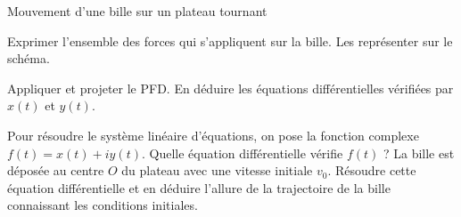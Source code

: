 \begin{exo}[PC][3][python]{Mouvement d'une bille sur un plateau tournant}
\begin{quest}
\item  Exprimer l'ensemble des forces qui s'appliquent sur la bille. Les représenter sur le schéma.

\item Appliquer et projeter le PFD. En déduire les équations différentielles vérifiées par $x(t)$ et $y(t)$.


\item  Pour résoudre le système linéaire d'équations, on pose la fonction complexe $f(t)=x(t) + iy(t)$. Quelle équation différentielle vérifie $f(t)$ ?  La bille est déposée au centre $O$ du plateau avec une vitesse initiale $v_0$.  Résoudre cette équation différentielle et en déduire l'allure de la trajectoire de la bille connaissant les conditions initiales.


\end{quest}
\end{exo}
